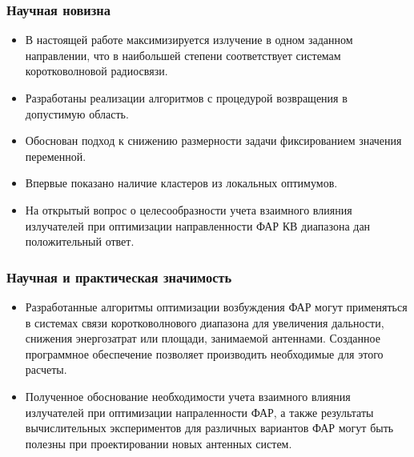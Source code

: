 \begin{frame}
    \frametitle{Научная новизна}
    \begin{itemize}

    \item В настоящей работе максимизируется излучение в одном заданном направлении, что в наибольшей степени соответствует системам коротковолновой радиосвязи.
    \item Разработаны реализации алгоритмов с процедурой возвращения в допустимую область.
    \item Обоснован подход к снижению размерности задачи фиксированием значения переменной.
    \item Впервые показано наличие кластеров из локальных оптимумов.
    \item На открытый вопрос о целесообразности учета взаимного влияния излучателей при оптимизации направленности ФАР КВ диапазона дан положительный ответ.
    \end{itemize}
\end{frame}

\begin{frame}
    \frametitle{Научная и практическая значимость}
    \begin{itemize}
        \item Разработанные алгоритмы оптимизации возбуждения ФАР могут  применяться в системах связи коротковолнового диапазона для увеличения дальности, снижения энергозатрат или площади, занимаемой антеннами. Созданное программное обеспечение позволяет производить необходимые для этого расчеты.
        \item Полученное обоснование необходимости учета взаимного влияния излучателей при оптимизации напраленности ФАР, а также результаты вычислительных экспериментов для различных вариантов ФАР могут быть полезны при проектировании новых антенных систем.

    \end{itemize}
\end{frame}


